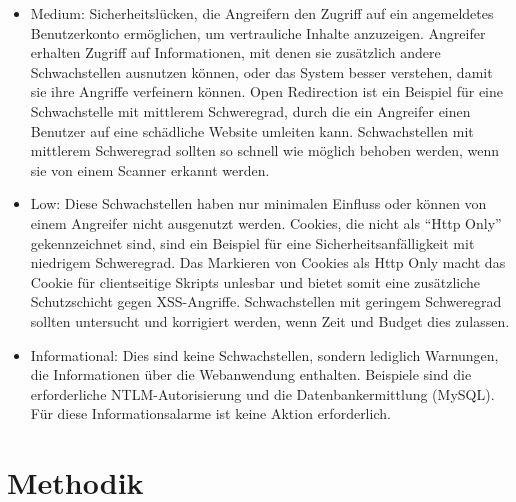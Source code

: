 \documentclass[12pt,oneside,a4paper,parskip,pointlessnumbers]{scrbook}
\begin{document}
\begin{itemize}
\begin{itemize}
      \item Medium: Sicherheitslücken, die Angreifern den Zugriff auf ein angemeldetes Benutzerkonto ermöglichen, um vertrauliche Inhalte anzuzeigen. Angreifer erhalten Zugriff auf Informationen, mit denen sie zusätzlich andere Schwachstellen ausnutzen können, oder das System besser verstehen, damit sie ihre Angriffe verfeinern können. Open Redirection ist ein Beispiel für eine Schwachstelle mit mittlerem Schweregrad, durch die ein Angreifer einen Benutzer auf eine schädliche Website umleiten kann. Schwachstellen mit mittlerem Schweregrad sollten so schnell wie möglich behoben werden, wenn sie von einem Scanner erkannt werden.

      \item Low: Diese Schwachstellen haben nur minimalen Einfluss oder können von einem Angreifer nicht ausgenutzt werden. Cookies, die nicht als ``Http Only'' gekennzeichnet sind, sind ein Beispiel für eine Sicherheitsanfälligkeit mit niedrigem Schweregrad. Das Markieren von Cookies als Http Only macht das Cookie für clientseitige Skripts unlesbar und bietet somit eine zusätzliche Schutzschicht gegen XSS-Angriffe. Schwachstellen mit geringem Schweregrad sollten untersucht und korrigiert werden, wenn Zeit und Budget dies zulassen.

      \item Informational: Dies sind keine Schwachstellen, sondern lediglich Warnungen, die Informationen über die Webanwendung enthalten. Beispiele sind die erforderliche NTLM-Autorisierung und die Datenbankermittlung (MySQL). Für diese Informationsalarme ist keine Aktion erforderlich.
    \end{itemize}

  \end{itemize}



\chapter{Methodik}
\end{document}
